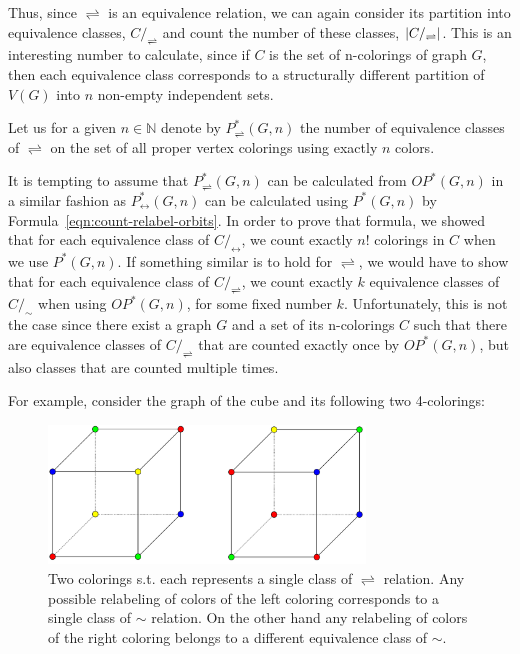 Thus, since $\rightleftharpoons$ is an equivalence relation, we can again consider its partition into equivalence classes, $C/_\rightleftharpoons$ and count the number of these classes, $\left|{C/_\rightleftharpoons}\right|$. This is an interesting number to calculate, since if $C$ is the set of n-colorings of graph $G$, then each equivalence class corresponds to a structurally different partition of $V(G)$ into $n$ non-empty independent sets.

\begin{defn}
    Let us for a given $n \in \mathbb{N}$ denote by $P^*_{\rightleftharpoons}(G,n)$ the number of equivalence classes of $\rightleftharpoons$ on the set of all proper vertex colorings using exactly $n$ colors. 
\end{defn}

It is tempting to assume that $P^*_{\rightleftharpoons}(G,n)$ can be calculated from $OP^*(G,n)$ in a similar fashion as $P^*_{\leftrightarrow}(G,n)$ can be calculated using $P^*(G,n)$ by Formula~\ref{eqn:count-relabel-orbits}. In order to prove that formula, we showed that for each equivalence class of $C/_\leftrightarrow$, we count exactly $n!$ colorings in $C$ when we use $P^*(G,n)$. If something similar is to hold for $\rightleftharpoons$, we would have to show that for each equivalence class of $C/_\rightleftharpoons$, we count exactly $k$ equivalence classes of $C/_\sim$ when using $OP^*(G,n)$, for some fixed number $k$. Unfortunately, this is not the case since there exist a graph $G$ and a set of its n-colorings $C$ such that there are equivalence classes of $C/_\rightleftharpoons$ that are counted exactly once by $OP^*(G,n)$, but also classes that are counted multiple times.

For example, consider the graph of the cube and its following two 4-colorings:

\begin{figure}[H]
    \centering
    \includegraphics[width=0.75\textwidth]{Resources/Figs/example_diff_rel-aut_class_sizes.pdf}
    \caption{Two colorings s.t. each represents a single class of $\rightleftharpoons$ relation. Any possible relabeling of colors of the left coloring corresponds to a single class of $\sim$ relation. On the other hand any relabeling of colors of the right coloring belongs to a different equivalence class of $\sim$.}
    \label{fig:example-cube-4-clrings-diff-classes}
\end{figure}

